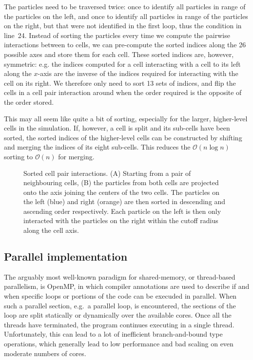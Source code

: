 \documentclass[final]{siamltex}
\newcommand{\oh}[1]
    {\mbox{$ {\mathcal O}( #1 ) $}}
\begin{document}
The particles need to be traversed twice: once to identify
all particles in range of the particles on the left, and
once to identify all particles in range of the particles on the
right, but that were not identified in the first loop,
thus the condition in line~24.
Instead of sorting the particles every time we compute the
pairwise interactions between to cells, we can pre-compute
the sorted indices along the 26 possible axes and store them
for each cell.
These sorted indices are, however, symmetric: e.g. the indices
computed for a cell interacting with a cell to its left along the
$x$-axis are the inverse of the indices required for interacting 
with the cell on its right.
We therefore only need to sort 13 sets of indices, and flip
the cells in a cell pair interaction around when the order
required is the opposite of the order stored.

This may all seem like quite a bit of sorting, especially
for the larger, higher-level cells in the simulation.
If, however, a cell is split and its sub-cells have been sorted,
the sorted indices of the higher-level cells can be constructed
by shifting and merging the indices of its eight sub-cells.
This reduces the \oh{n\log{n}} sorting to \oh{n} for merging. 


\begin{figure}[ht]
    \centerline{}
    
    \caption{Sorted cell pair interactions. ({\sf A}) Starting from a pair of
        neighbouring cells, ({\sf B}) the particles from both cells
        are projected onto the axis joining the centers of the two cells.
        The particles on the left (blue) and right (orange) are
        then sorted in descending and ascending order respectively.
        Each particle on the left is then only interacted with
        the particles on the right within the cutoff radius along the cell axis.
        }
    \label{fig:SortedInteractions}
\end{figure}


\subsection{Parallel implementation}

The arguably most well-known paradigm for shared-memory,
or thread-based parallelism, is OpenMP, in which
compiler annotations are used to describe if and when
specific loops or portions of the code can be execuded
in parallel.
When such a parallel section, e.g.~a parallel loop, is
encountered, the sections of the loop are split statically
or dynamically over the available cores.
Once all the threads have terminated, the program continues
executing in a single thread.
Unfortunately, this can lead to a lot of inefficient
branch-and-bound
type operations, which generally lead to low performance and
bad scaling on even moderate numbers of cores.
\end{document}
